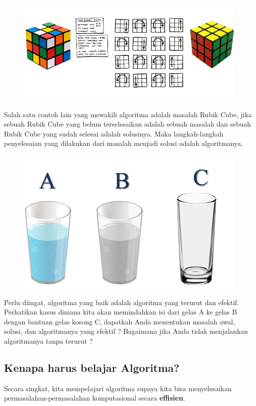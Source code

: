 \begin{figure}
	\centering
	\includegraphics[scale=0.5]{fig/1/Gambar8.png}	
\end{figure}

Salah satu contoh lain yang mewakili algoritma adalah masalah Rubik Cube, jika sebuah Rubik Cube yang belum terselesaikan adalah sebuah masalah dan sebuah Rubik Cube yang sudah selesai adalah solusinya. Maka langkah-langkah penyelesaian yang dilakukan dari masalah menjadi solusi adalah algoritmanya. 

\begin{figure}
	\centering
	\includegraphics[scale=0.5]{fig/1/Gambar9.png}	
\end{figure}

Perlu diingat, algoritma yang baik adalah algoritma yang terurut dan efektif.  Perhatikan kasus  dimana kita akan memindahkan isi dari gelas A ke gelas B dengan bantuan gelas kosong C, dapatkah Anda menentukan masalah awal, solusi, dan algoritmanya yang efektif ? Bagaimana jika Anda tidak menjalankan algoritmanya tanpa terurut ? 


\subsection{Kenapa harus belajar Algoritma?}
Secara singkat, kita mempelajari algoritma supaya kita bisa menyelesaikan permasalahan-permasalahan komputasional secara \textbf{effisien}.  

